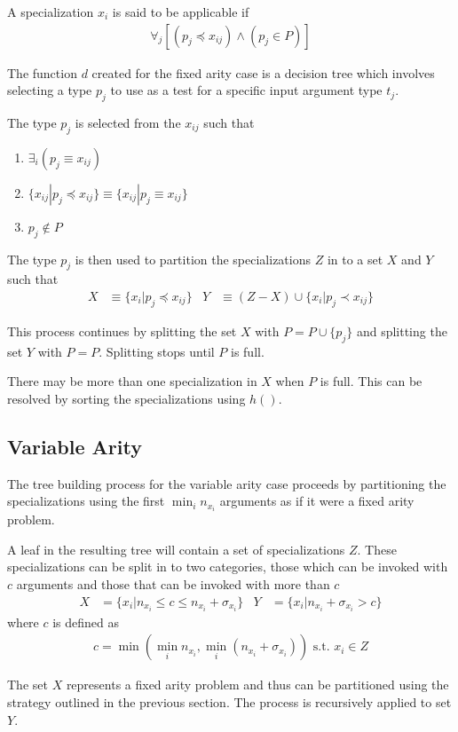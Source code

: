 \documentclass{article}
\begin{document}
A specialization $x_i$ is said to be applicable if
\begin{align}
  \forall_j \left[(p_j \preceq x_{ij}) \land (p_j \in P) \right]
\end{align}

The function $d$ created for the fixed arity case is a decision tree
which involves selecting a type $p_j$ to use as a test for a specific
input argument type $t_j$.

The type $p_j$ is selected from the $x_{ij}$ such that
\begin{enumerate}
\item $\exists_i (p_j \equiv x_{ij})$
\item $\{x_{ij} | p_j \preceq x_{ij} \} \equiv \{x_{ij} | p_j \equiv x_{ij}\}$
\item $p_j \notin P$
\end{enumerate}

The type $p_j$ is then used to partition the specializations $Z$ in to
a set $X$ and $Y$ such that
\begin{align}
  X & \equiv \{ x_i | p_j \preceq x_{ij} \} & Y & \equiv (Z - X) \cup \{ x_i | p_j \prec x_{ij} \}
\end{align}

This process continues by splitting the set $X$ with
$P = P \cup \{ p_j \}$ and splitting the set $Y$ with $P =
P$. Splitting stops until $P$ is full.

There may be more than one specialization in $X$ when $P$ is
full. This can be resolved by sorting the specializations using $h()$.

\subsection{Variable Arity}
The tree building process for the variable arity case proceeds by
partitioning the specializations using the first $\min_i n_{x_i}$
arguments as if it were a fixed arity problem.

A leaf in the resulting tree will contain a set of specializations
$Z$. These specializations can be split in to two categories, those
which can be invoked with $c$ arguments and those that can be invoked
with more than $c$
\begin{align}
  X & = \{ x_i | n_{x_i} \leq c \leq n_{x_i} + \sigma_{x_i} \} & Y &= \{ x_i | n_{x_i} + \sigma_{x_i} > c \}
\end{align}
where $c$ is defined as
\begin{align}
  c = \min(\min_i n_{x_i}, \min_i (n_{x_i} + \sigma_{x_i}) ) \textrm{ s.t. } x_i \in Z
\end{align}

The set $X$ represents a fixed arity problem and thus can be
partitioned using the strategy outlined in the previous section. The
process is recursively applied to set $Y$.
\end{document}
